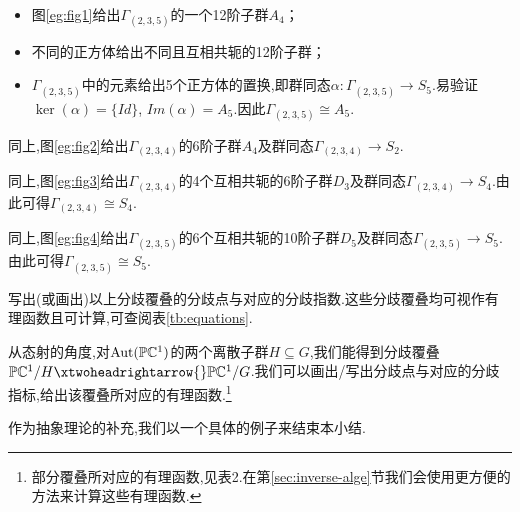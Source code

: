 \begin{example1}\
		\begin{itemize}
			\item 图\ref{eg:fig1}给出$\Gamma_{(2,3,5)}$的一个12阶子群$A_4$；
			
			\item 不同的正方体给出不同且互相共轭的12阶子群；
			
			\item $\Gamma_{(2,3,5)}$中的元素给出5个正方体的置换,即群同态$\alpha:\Gamma_{(2,3,5)}\longrightarrow S_5$.易验证$\ker(\alpha)=\{Id\}$, $Im(\alpha)=A_5$.因此$\Gamma_{(2,3,5)}\cong A_5$.
			
		\end{itemize}
	
\end{example1}
\begin{example1}
		同上,图\ref{eg:fig2}给出$\Gamma_{(2,3,4)}$的6阶子群$A_4$及群同态$\Gamma_{(2,3,4)}\longrightarrow S_2$.
\end{example1}
\begin{example1}		
		同上,图\ref{eg:fig3}给出$\Gamma_{(2,3,4)}$的4个互相共轭的6阶子群$D_3$及群同态$\Gamma_{(2,3,4)}\longrightarrow S_4$.由此可得$\Gamma_{(2,3,4)}\cong S_4$.
\end{example1}
\begin{example1}
		同上,图\ref{eg:fig4}给出$\Gamma_{(2,3,5)}$的6个互相共轭的10阶子群$D_5$及群同态$\Gamma_{(2,3,5)}\longrightarrow S_5$.由此可得$\Gamma_{(2,3,5)}\cong S_5$.
\end{example1}


\begin{exercise}
	写出(或画出)以上分歧覆叠的分歧点与对应的分歧指数.这些分歧覆叠均可视作有理函数且可计算,可查阅表\ref{tb:equations}.
\end{exercise}

从态射的角度,对$\operatorname{Aut} (\mathbb{P}\mathbb{C}^1)$的两个离散子群$H \subseteq G$,我们能得到分歧覆叠$\mathbb{P}\mathbb{C}^1/H \xtwoheadrightarrow{} \mathbb{P}\mathbb{C}^1/G$.我们可以画出/写出分歧点与对应的分歧指标,给出该覆叠所对应的有理函数.\footnote{部分覆叠所对应的有理函数,见表2.在第\ref{sec:inverse-alge}节我们会使用更方便的方法来计算这些有理函数.}

作为抽象理论的补充,我们以一个具体的例子来结束本小结.

